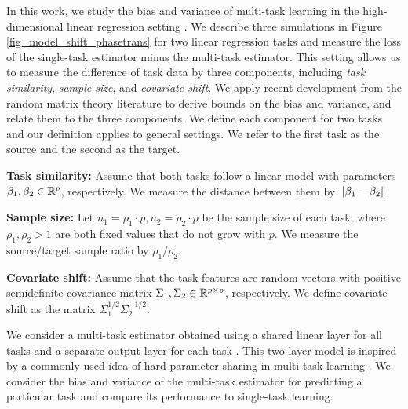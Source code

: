 In this work, we study the bias and variance of multi-task learning in the high-dimensional linear regression setting \cite{HMRT19,BLLT20}.
We describe three simulations in Figure \ref{fig_model_shift_phasetrans} for two linear regression tasks and measure the loss of the single-task estimator minus the multi-task estimator.
This setting allows us to measure the difference of task data by three components, including \textit{task similarity}, \textit{sample size}, and \textit{covariate shift}.
We apply recent development from the random matrix theory literature \cite{erdos2017dynamical,isotropic,Anisotropic} to derive bounds on the bias and variance, and relate them to the three components.
We define each component for two tasks and our definition applies to general settings.
We refer to the first task as the source and the second as the target.
\squishlist
	\item \textbf{Task similarity:} Assume that both tasks follow a linear model with parameters $\beta_1, \beta_2\in\mathbb{R}^p$, respectively.
	We measure the distance between them by $\|\beta_1 - \beta_2\|$.
	\item \textbf{Sample size:} Let $n_1 = \rho_1 \cdot p, n_2 = \rho_2 \cdot p$ be the sample size of each task, where $\rho_1, \rho_2>1$ are both fixed values that do not grow with $p$.
	We measure the source/target sample ratio by $\rho_1 / \rho_2$.
	\item \textbf{Covariate shift:} Assume that the task features are random vectors with positive semidefinite covariance matrix $\Sigma_1,\Sigma_2\in\mathbb{R}^{p\times p}$, respectively.
	We define covariate shift as the matrix $\Sigma_1^{1/2}\Sigma_2^{-1/2}$.
\squishend


We consider a multi-task estimator obtained using a shared linear layer for all tasks and a separate output layer for each task \cite{WZR20}.
This two-layer model is inspired by a commonly used idea of hard parameter sharing in multi-task learning \cite{R17,MTDNN19}.
We consider the bias and variance of the multi-task estimator for predicting a particular task and compare its performance to single-task learning.

